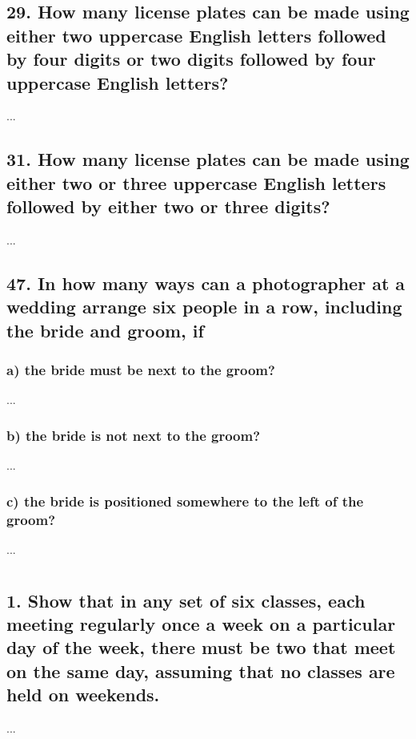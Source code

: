 \documentclass[11pt, oneside]{article} %
\numberwithin{equation}{section} %
\numberwithin{figure}{section} %
\numberwithin{table}{section} %
\begin{document}

\subsection{29. How many license plates can be made using either two uppercase English letters followed by four digits or two digits followed by four uppercase English letters?}
... 

\subsection{31. How many license plates can be made using either two or three uppercase English letters followed by either two or three digits?}
...
 

\subsection{47. In how many ways can a photographer at a wedding arrange six people in a row, including the bride and groom, if}
\subsubsection{a) the bride must be next to the groom?}
...
 
\subsubsection{b) the bride is not next to the groom?}
...

\subsubsection{c) the bride is positioned somewhere to the left of the groom?}
...


\section{}
\subsection{1. Show that in any set of six classes, each meeting regularly once a week on a particular day of the week, there must be two that meet on the same day, assuming that no classes are held on weekends.}
...
\end{document}
